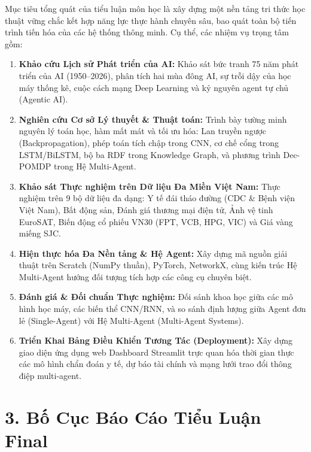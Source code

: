 \documentclass[12pt,a4paper]{report}
\begin{document}
Mục tiêu tổng quát của tiểu luận môn học là xây dựng một nền tảng tri thức học thuật vững chắc kết hợp năng lực thực hành chuyên sâu, bao quát toàn bộ tiến trình tiến hóa của các hệ thống thông minh. Cụ thể, các nhiệm vụ trọng tâm gồm:
\begin{enumerate}[leftmargin=1.2cm, label={\textbf{Nhiệm vụ \arabic*:}}]
    \item \textbf{Khảo cứu Lịch sử Phát triển của AI:} Khảo sát bức tranh 75 năm phát triển của AI (1950--2026), phân tích hai mùa đông AI, sự trỗi dậy của học máy thống kê, cuộc cách mạng Deep Learning và kỷ nguyên agent tự chủ (Agentic AI).
    \item \textbf{Nghiên cứu Cơ sở Lý thuyết \& Thuật toán:} Trình bày tường minh nguyên lý toán học, hàm mất mát và tối ưu hóa: Lan truyền ngược (Backpropagation), phép toán tích chập trong CNN, cơ chế cổng trong LSTM/BiLSTM, bộ ba RDF trong Knowledge Graph, và phương trình Dec-POMDP trong Hệ Multi-Agent.
    \item \textbf{Khảo sát Thực nghiệm trên Dữ liệu Đa Miền Việt Nam:} Thực nghiệm trên 9 bộ dữ liệu đa dạng: Y tế đái tháo đường (CDC \& Bệnh viện Việt Nam), Bất động sản, Đánh giá thương mại điện tử, Ảnh vệ tinh EuroSAT, Biến động cổ phiếu VN30 (FPT, VCB, HPG, VIC) và Giá vàng miếng SJC.
    \item \textbf{Hiện thực hóa Đa Nền tảng \& Hệ Agent:} Xây dựng mã nguồn giải thuật trên Scratch (NumPy thuần), PyTorch, NetworkX, cùng kiến trúc Hệ Multi-Agent hướng đối tượng tích hợp các công cụ chuyên biệt.
    \item \textbf{Đánh giá \& Đối chuẩn Thực nghiệm:} Đối sánh khoa học giữa các mô hình học máy, các biến thể CNN/RNN, và so sánh định lượng giữa Agent đơn lẻ (Single-Agent) với Hệ Multi-Agent (Multi-Agent Systems).
    \item \textbf{Triển Khai Bảng Điều Khiển Tương Tác (Deployment):} Xây dựng giao diện ứng dụng web Dashboard Streamlit trực quan hóa thời gian thực các mô hình chẩn đoán y tế, dự báo tài chính và mạng lưới trao đổi thông điệp multi-agent.
\end{enumerate}

\section*{3. Bố Cục Báo Cáo Tiểu Luận Final}
\end{document}
